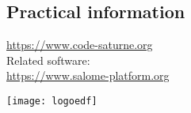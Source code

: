 \documentclass[a4paper,11pt]{article}
\begin{document}
\begin{multicols*}{3}

\section*{Practical information}

\url{https://www.code-saturne.org}\\

Related software:\\
\url{https://www.salome-platform.org}

\begin{center}
  \texttt{[image: logoedf]}
\end{center}

\end{multicols*}
\end{document}
